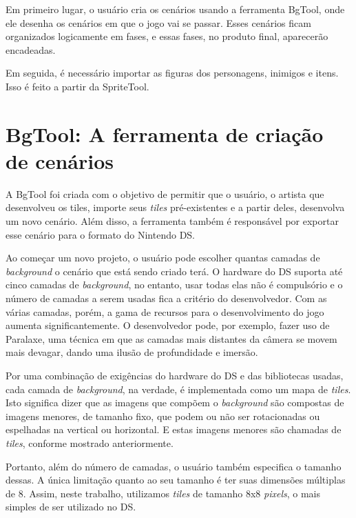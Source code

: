 \documentclass[brazil]{abnt}
\begin{document}
Em primeiro lugar, o usuário cria os cenários usando a ferramenta BgTool, onde ele desenha os cenários em que o jogo vai se passar. Esses cenários ficam organizados logicamente em fases, e essas fases, no produto final, aparecerão encadeadas.

Em seguida, é necessário importar as figuras dos personagens, inimigos e itens. Isso é feito a partir da SpriteTool.

\section{BgTool: A ferramenta de criação de cenários}

A BgTool foi criada com o objetivo de permitir que o usuário, o artista que desenvolveu os tiles, importe seus \textit{tiles} pré-existentes e a partir deles, desenvolva um novo cenário. Além disso, a ferramenta também é responsável por exportar esse cenário para o formato do Nintendo DS.

Ao começar um novo projeto, o usuário pode escolher quantas camadas de \textit{background} o cenário que está sendo criado terá. O hardware do DS suporta até cinco camadas de \textit{background}, no entanto, usar todas elas não é compulsório e o número de camadas a serem usadas fica a critério do desenvolvedor. Com as várias camadas, porém, a gama de recursos para o desenvolvimento do jogo aumenta significantemente. O desenvolvedor pode, por exemplo, fazer uso de Paralaxe, uma técnica em que as camadas mais distantes da câmera se movem mais devagar, dando uma ilusão de profundidade e imersão.

Por uma combinação de exigências do hardware do DS e das bibliotecas usadas, cada camada de \textit{background}, na verdade, é implementada como um mapa de \textit{tiles}. Isto significa dizer que as imagens que compõem o \textit{background} são compostas de imagens menores, de tamanho fixo, que podem ou não ser rotacionadas ou espelhadas na vertical ou horizontal. E estas imagens menores são chamadas de \textit{tiles}, conforme mostrado anteriormente.

Portanto, além do número de camadas, o usuário também especifica o tamanho dessas. A única limitação quanto ao seu tamanho é ter suas dimensões múltiplas de 8. Assim, neste trabalho, utilizamos \textit{tiles} de tamanho 8x8 \textit{pixels}, o mais simples de ser utilizado no DS.
\end{document}
